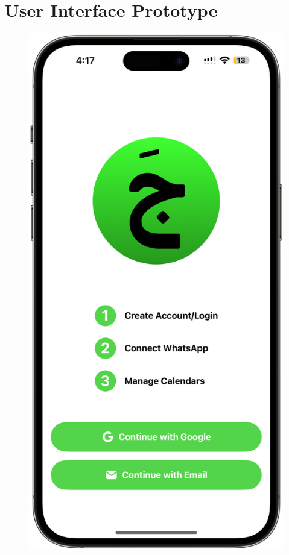 \section{User Interface Prototype}

\begin{figure}[!h]
    \begin{minipage}{0.3\textwidth}
        \centering
        \includegraphics[width=\textwidth]{images/screen1.png}

\end{minipage}
\end{figure}
